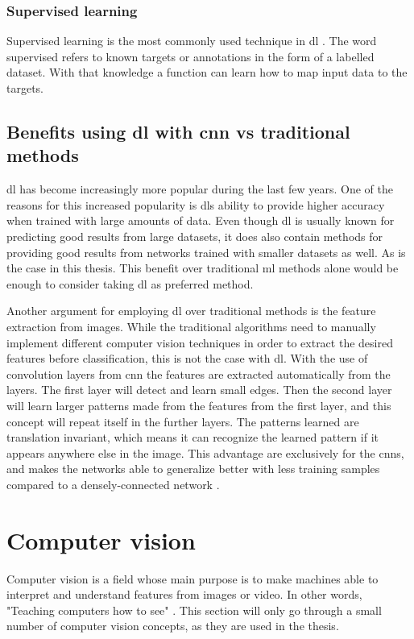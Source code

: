 \documentclass[USenglish]{ifimaster}  %
\begin{document}
\subsubsection{Supervised learning}
Supervised learning is the most commonly used technique in \ac{dl} \cite{Francois_Deep_learning_with_python}. The word supervised refers to known targets or annotations in the form of a labelled dataset. With that knowledge a function can learn how to map input data to the targets.

\subsection{Benefits using \ac{dl} with \ac{cnn} vs traditional methods}
\ac{dl} has become increasingly more popular during the last few years. One of the reasons for this increased popularity is \acp{dl} ability to provide higher accuracy when trained with large amounts of data. Even though \ac{dl} is usually known for predicting good results from large datasets, it does also contain methods for providing good results from networks trained with smaller datasets as well. As is the case in this thesis. This benefit over traditional \ac{ml} methods alone would be enough to consider taking \ac{dl} as preferred method.

Another argument for employing \ac{dl} over traditional methods is the feature extraction from images. While the traditional algorithms need to manually implement different computer vision techniques in order to extract the desired features before classification, this is not the case with \ac{dl}. With the use of convolution layers from \ac{cnn} the features are extracted automatically from the layers.
The first layer will detect and learn small edges. Then the second layer will learn larger patterns made from the features from the first layer, and this concept will repeat itself in the further layers. The patterns learned are translation invariant, which means it can recognize the learned pattern if it appears anywhere else in the image. This advantage are exclusively for the \acp{cnn}, and makes the networks able to generalize better with less training samples compared to a densely-connected network \cite{Francois_Deep_learning_with_python}.

\section{Computer vision}
Computer vision is a field whose main purpose is to make machines able to interpret and understand features from images or video. In other words, "Teaching computers how to see" \cite{website:maskinsyn-intro}. This section will only go through a small number of computer vision concepts, as they are used in the thesis.
\end{document}
